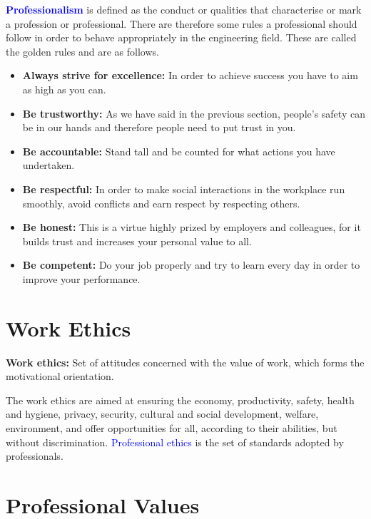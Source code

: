 \documentclass[12pt, a4papre]{article}
\begin{document}
	\textbf{\textcolor{blue}{Professionalism}} is defined as the conduct or qualities that characterise or mark a profession or professional. There are therefore some rules a professional should follow in order to behave appropriately in the engineering field. These are called the golden rules and are as follows.
	\begin{itemize}
		\item \textbf{Always strive for excellence:} In order to achieve success you have to aim as high as you can.
		\item \textbf{Be trustworthy:} As we have said in the previous section, people's safety can be in our hands and therefore people need to put trust in you.
		\item \textbf{Be accountable:} Stand tall and be counted for what actions you have undertaken.
		\item \textbf{Be respectful:} In order to make social interactions in the workplace run smoothly, avoid conflicts and earn respect by respecting others.
		\item \textbf{Be honest:} This is a virtue highly prized by employers and colleagues, for it builds trust and increases your personal value to all.
		\item \textbf{Be competent:} Do your job properly and try to learn every day in order to improve your performance.
	\end{itemize}
	
	\section{Work Ethics}
	
	\textbf{Work ethics:}  Set of attitudes concerned with the value of work, which forms the motivational orientation.
	
	The work ethics are aimed at ensuring the economy, productivity, safety, health and hygiene, privacy, security, cultural and social development, welfare, environment, and offer opportunities for all, according to their abilities, but without discrimination. \textcolor{blue}{Professional ethics} is the set of standards adopted by professionals.
	
	\section{Professional Values}
	
\end{document}
